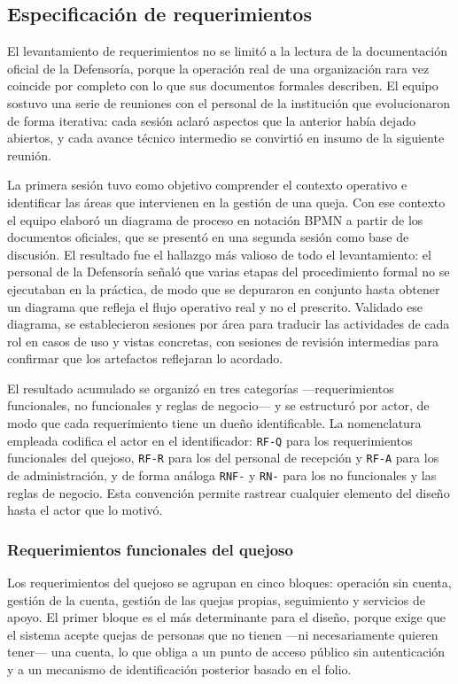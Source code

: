 	\subsection{Especificación de requerimientos}
	\label{sec:requerimientos}
	El levantamiento de requerimientos no se limitó a la lectura de la documentación oficial de la
	Defensoría, porque la operación real de una organización rara vez coincide por completo con lo
	que sus documentos formales describen. El equipo sostuvo una serie de reuniones con el personal
	de la institución que evolucionaron de forma iterativa: cada sesión aclaró aspectos que la
	anterior había dejado abiertos, y cada avance técnico intermedio se convirtió en insumo de la
	siguiente reunión.
	
	La primera sesión tuvo como objetivo comprender el contexto operativo e identificar las áreas
	que intervienen en la gestión de una queja. Con ese contexto el equipo elaboró un diagrama de
	proceso en notación BPMN a partir de los documentos oficiales, que se presentó en una segunda
	sesión como base de discusión. El resultado fue el hallazgo más valioso de todo el
	levantamiento: el personal de la Defensoría señaló que varias etapas del procedimiento formal
	no se ejecutaban en la práctica, de modo que se depuraron en conjunto hasta obtener un diagrama
	que refleja el flujo operativo real y no el prescrito. Validado ese diagrama, se establecieron
	sesiones por área para traducir las actividades de cada rol en casos de uso y vistas concretas,
	con sesiones de revisión intermedias para confirmar que los artefactos reflejaran lo acordado.
	
	El resultado acumulado se organizó en tres categorías ---requerimientos funcionales, no
	funcionales y reglas de negocio--- y se estructuró por actor, de modo que cada requerimiento
	tiene un dueño identificable. La nomenclatura empleada codifica el actor en el identificador:
	\texttt{RF-Q} para los requerimientos funcionales del quejoso, \texttt{RF-R} para los del
	personal de recepción y \texttt{RF-A} para los de administración, y de forma análoga
	\texttt{RNF-} y \texttt{RN-} para los no funcionales y las reglas de negocio. Esta convención
	permite rastrear cualquier elemento del diseño hasta el actor que lo motivó.
	
	\subsubsection{Requerimientos funcionales del quejoso}
	Los requerimientos del quejoso se agrupan en cinco bloques: operación sin cuenta, gestión de la
	cuenta, gestión de las quejas propias, seguimiento y servicios de apoyo. El primer bloque es el
	más determinante para el diseño, porque exige que el sistema acepte quejas de personas que no
	tienen ---ni necesariamente quieren tener--- una cuenta, lo que obliga a un punto de acceso
	público sin autenticación y a un mecanismo de identificación posterior basado en el folio.
	
